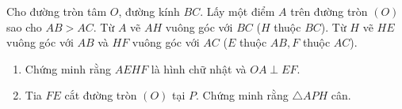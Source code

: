 \begin{ex}%
    Cho đường tròn tâm $O$, đường kính $BC$. Lấy một điểm $A$ trên đường tròn $(O)$ sao cho $AB>AC$. Từ $A$ vẽ $AH$ vuông góc với $BC$ ($H$ thuộc $BC$). Từ $H$ vẽ $HE$ vuông góc với $AB$ và $HF$ vuông góc với $AC$ ($E$ thuộc $AB,F$ thuộc $AC$).
    \begin{enumerate}
    \item Chứng minh rằng $AEHF$ là hình chữ nhật và $OA \perp EF.$
    \item Tia $FE$ cắt đường tròn $(O)$ tại $P$. Chứng minh rằng $\triangle APH$ cân.
    \end{enumerate}
\end{ex}
